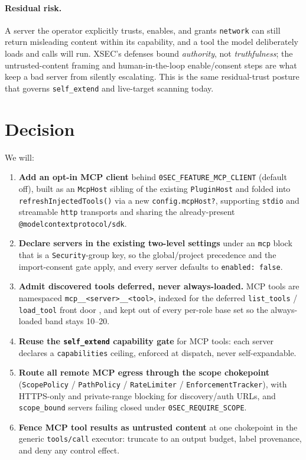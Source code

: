 \documentclass[11pt]{article}
\begin{document}
\paragraph{Residual risk.} A server the operator explicitly trusts, enables, and
grants \texttt{network} can still return misleading content within its
capability, and a tool the model deliberately loads and calls will run. XSEC's
defenses bound \emph{authority}, not \emph{truthfulness}; the untrusted-content
framing and human-in-the-loop enable/consent steps are what keep a bad server
from silently escalating. This is the same residual-trust posture that governs
\texttt{self\_extend} and live-target scanning today.

\section{Decision}

We will:
\begin{enumerate}[leftmargin=*]
  \item \textbf{Add an opt-in MCP client} behind \texttt{0SEC\_FEATURE\_MCP\_CLIENT}
  (default off), built as an \texttt{McpHost} sibling of the existing
  \texttt{PluginHost} and folded into \texttt{refreshInjectedTools()} via a new
  \texttt{config.mcpHost?}, supporting \texttt{stdio} and streamable \texttt{http}
  transports and sharing the already-present \texttt{@modelcontextprotocol/sdk}.
  \item \textbf{Declare servers in the existing two-level settings} under an
  \texttt{mcp} block that is a \texttt{Security}-group key, so the
  global/project precedence and the import-consent gate apply, and every server
  defaults to \texttt{enabled: false}.
  \item \textbf{Admit discovered tools deferred, never always-loaded.} MCP tools
  are namespaced \texttt{mcp\_\_<server>\_\_<tool>}, indexed for the deferred
  \texttt{list\_tools} / \texttt{load\_tool} front door \cite{tool-curation}, and
  kept out of every per-role base set so the always-loaded band stays 10--20.
  \item \textbf{Reuse the \texttt{self\_extend} capability gate} for MCP tools:
  each server declares a \texttt{capabilities} ceiling, enforced at dispatch,
  never self-expandable.
  \item \textbf{Route all remote MCP egress through the scope chokepoint}
  (\texttt{ScopePolicy} / \texttt{PathPolicy} / \texttt{RateLimiter} /
  \texttt{EnforcementTracker}), with HTTPS-only and private-range blocking for
  discovery/auth URLs, and \texttt{scope\_bound} servers failing closed under
  \texttt{0SEC\_REQUIRE\_SCOPE}.
  \item \textbf{Fence MCP tool results as untrusted content} at one chokepoint in
  the generic \texttt{tools/call} executor: truncate to an output budget, label
  provenance, and deny any control effect.
\end{enumerate}
\end{document}
